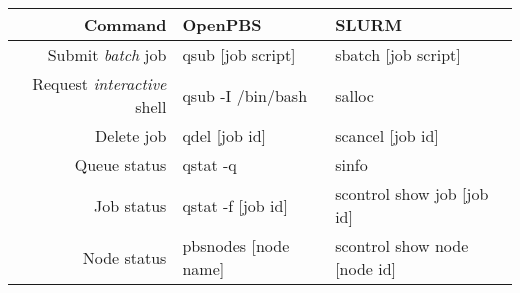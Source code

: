 \small
{\renewcommand{\arraystretch}{1.2}%
\begin{tabularx}{\textwidth}{r|X|X}
\toprule
{\bf Command} & {\bf OpenPBS} & {\bf SLURM}  \\
\midrule

Submit {\em batch} job &
qsub [job script] &
sbatch [job script]
\\ \hline

Request {\em interactive} shell &
qsub -I /bin/bash &
salloc
\\ \hline

Delete job &
qdel [job id] &
scancel [job id]
\\ \hline

Queue status &
qstat -q &
sinfo
\\ \hline

Job status &
qstat -f [job id]  &
scontrol show job [job id]
\\ \hline

Node status &
pbsnodes [node name] &
scontrol show node [node id]
\\ \hline

\bottomrule
\end{tabularx}}



